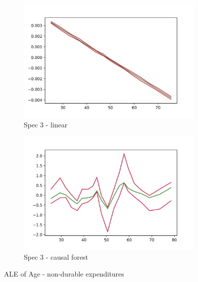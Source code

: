 \begin{figure}[t]
    \begin{subfigure}{0.5\linewidth}
        \includegraphics[width=\textwidth]{figures/ALE/chNDexp/spec3_linear_AGE.png}
        \caption{Spec 3 - linear}
    \end{subfigure}%
    \begin{subfigure}{0.5\linewidth}
        \includegraphics[width=\textwidth]{figures/ALE/chNDexp/spec1_cf_AGE.png}
        \caption{Spec 3 - causal forest}
    \end{subfigure}
    \caption{ALE of Age - non-durable expenditures}
    \label{fig:ale_age}
\end{figure}
